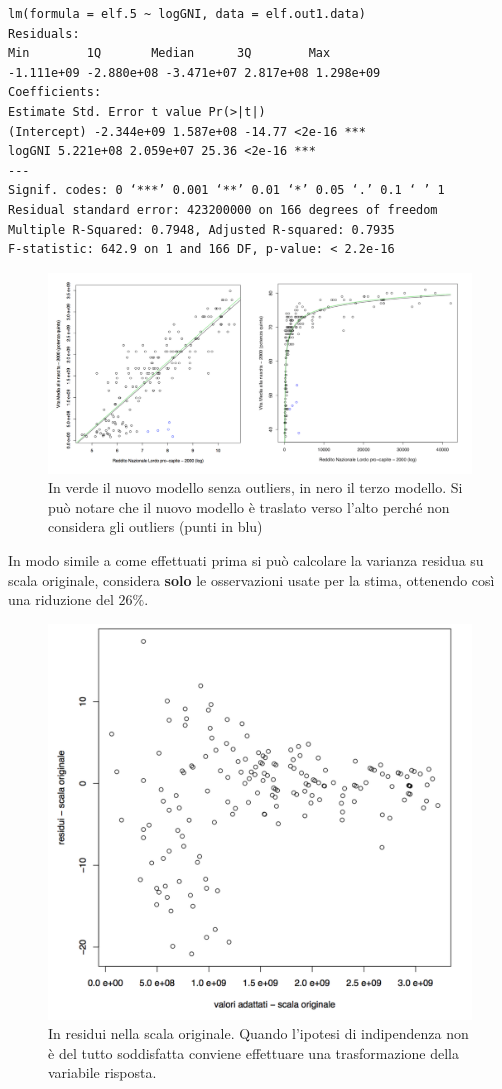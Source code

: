 \begin{verbatim}
lm(formula = elf.5 ~ logGNI, data = elf.out1.data)
Residuals:
Min        1Q       Median      3Q        Max
-1.111e+09 -2.880e+08 -3.471e+07 2.817e+08 1.298e+09
Coefficients:
Estimate Std. Error t value Pr(>|t|) 
(Intercept) -2.344e+09 1.587e+08 -14.77 <2e-16 *** 
logGNI 5.221e+08 2.059e+07 25.36 <2e-16 ***
---
Signif. codes: 0 ‘***’ 0.001 ‘**’ 0.01 ‘*’ 0.05 ‘.’ 0.1 ‘ ’ 1
Residual standard error: 423200000 on 166 degrees of freedom 
Multiple R-Squared: 0.7948, Adjusted R-squared: 0.7935 
F-statistic: 642.9 on 1 and 166 DF, p-value: < 2.2e-16
\end{verbatim}
\begin{figure}[htbp]
	\centering
	\includegraphics[width=1\textwidth]{./notes/immagini/l8-fig2.png}
	\caption{In verde il nuovo modello senza outliers, in nero il terzo modello. Si può notare che il nuovo modello è traslato verso l'alto perché non considera gli outliers (punti in blu)}
\end{figure}

In modo simile a come effettuati prima si può calcolare la varianza residua su scala originale, considera \textbf{solo} le osservazioni usate per la stima, ottenendo così una riduzione del $ 26\% $.

\begin{figure}[htbp]
	\centering
	\includegraphics[width=.5\textwidth]{./notes/immagini/l8-fig3.png}
	\caption{In residui nella scala originale. Quando l'ipotesi di indipendenza non è del tutto soddisfatta conviene effettuare una trasformazione della variabile risposta.}
\end{figure}


